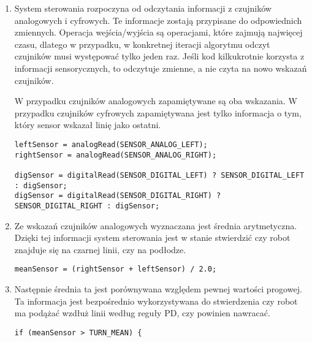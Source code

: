 \documentclass[11pt]{article}
\begin{document}
\begin{enumerate}
\item System sterowania rozpoczyna od odczytania informacji z czujników analogowych i cyfrowych. Te informacje zostają przypisane do odpowiednich zmiennych. Operacja wejścia/wyjścia są operacjami, które zajmują najwięcej czasu, dlatego w przypadku, w konkretnej iteracji algorytmu odczyt czujników musi występować tylko jeden raz. Jeśli kod kilkukrotnie korzysta z informacji sensorycznych, to odczytuje zmienne, a nie czyta na nowo wskazań czujników.

W przypadku czujników analogowych zapamiętywane są oba wskazania. W przypadku czujników cyfrowych zapamiętywana jest tylko informacja o tym, który sensor wskazał linię jako ostatni.
\begin{lstlisting}[firstnumber = 78]
leftSensor = analogRead(SENSOR_ANALOG_LEFT);
rightSensor = analogRead(SENSOR_ANALOG_RIGHT);

digSensor = digitalRead(SENSOR_DIGITAL_LEFT) ? SENSOR_DIGITAL_LEFT : digSensor;
digSensor = digitalRead(SENSOR_DIGITAL_RIGHT) ? SENSOR_DIGITAL_RIGHT : digSensor;
\end{lstlisting}

\item Ze wskazań czujników analogowych wyznaczana jest średnia arytmetyczna. Dzięki tej informacji system sterowania jest w stanie stwierdzić czy robot znajduje się na czarnej linii, czy na podłodze.
\begin{lstlisting}[firstnumber = 86]
meanSensor = (rightSensor + leftSensor) / 2.0;
\end{lstlisting}

\item Następnie średnia ta jest porównywana względem pewnej wartości progowej. Ta informacja jest bezpośrednio wykorzystywana do stwierdzenia czy robot ma podążać wzdłuż linii według reguły PD, czy powinien nawracać.
\begin{lstlisting}[firstnumber = 91]
if (meanSensor > TURN_MEAN) {
\end{lstlisting}
\end{enumerate}
\end{document}
